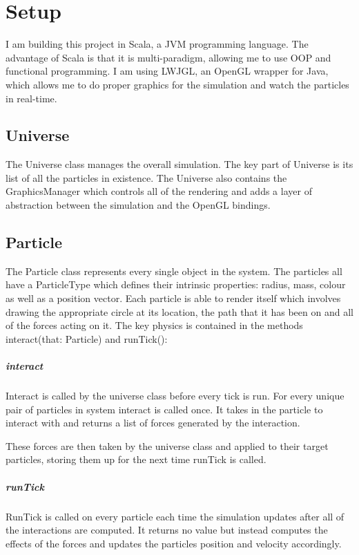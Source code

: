 \section{Setup}

	I am building this project in Scala, a JVM programming language. The advantage of Scala is that it is multi-paradigm, allowing me to use OOP and functional programming. I am using LWJGL, an OpenGL wrapper for Java, which allows me to do proper graphics for the simulation and watch the particles in real-time.
	
	\subsection{Universe}
	
		The Universe class manages the overall simulation. The key part of Universe is its list of all the particles in existence. The Universe also contains the GraphicsManager which controls all of the rendering and adds a layer of abstraction between the simulation and the OpenGL bindings. 
		
	\subsection{Particle}
	
		The Particle class represents every single object in the system. The particles all have a ParticleType which defines their intrinsic properties: radius, mass, colour as well as a position vector. Each particle is able to render itself which involves drawing the appropriate circle at its location, the path that it has been on and all of the forces acting on it.
		\linebreak\linebreak
		The key physics is contained in the methods interact(that: Particle) and runTick():
		
		\subparagraph{interact}
		
			Interact is called by the universe class before every tick is run. For every unique pair of particles in system interact is called once. It takes in the particle to interact with and returns a list of forces generated by the interaction.
			
			These forces are then taken by the universe class and applied to their target particles, storing them up for the next time runTick is called.
		
		\subparagraph{runTick}
			
			RunTick is called on every particle each time the simulation updates after all of the interactions are computed. It returns no value but instead computes the effects of the forces and updates the particles position and velocity accordingly.
			
